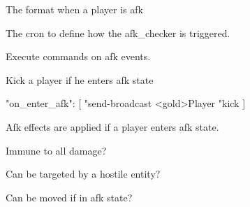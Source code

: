 \begin{Configuration}
    \item[format]{The  format when a player is afk}

    \item[afk\_checker]{
        \begin{NestedList}
            \item[]
            \item[cron]{The cron to define how the afk\_checker is triggered.}
        \end{NestedList}

    }

    \item[afk\_event]{
        Execute commands on afk events.
        \begin{example}{Kick a player if he enters afk state}
            \begin{json}
                "on_enter_afk": [
                "send-broadcast <gold>Player %
                "kick %
                ]
            \end{json}
        \end{example}
    }


    \item[event]{
        Afk effects are applied if a player enters afk state.

        \begin{NestedList}
            \item[invulnerable]{
                Immune to all damage?
            }

            \item[targetable]{
                Can be targeted by a hostile entity?
            }

            \item[moveable]{
                Can be moved if in afk state?
            }

        \end{NestedList}
    }

\end{Configuration}













